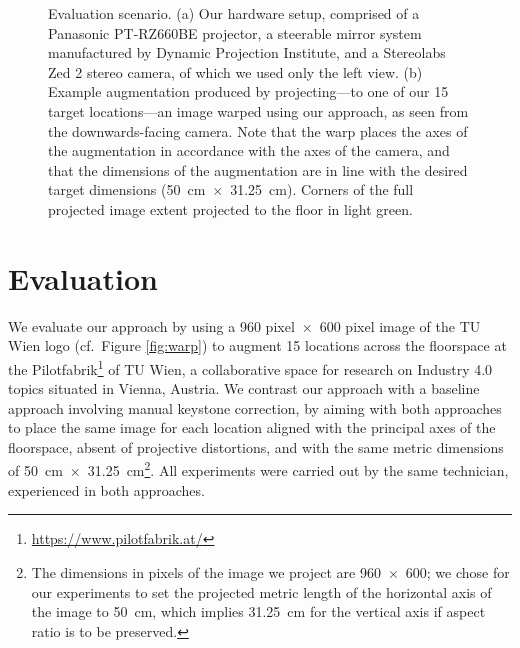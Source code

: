 \documentclass[review]{elsarticle}
\begin{document}
\begin{figure}
    \centering
    \quad
    \caption{Evaluation scenario. (a) Our hardware setup, comprised of a Panasonic PT-RZ660BE projector, a steerable mirror system manufactured by Dynamic Projection Institute, and a Stereolabs Zed 2 stereo camera, of which we used only the left view. (b) Example augmentation produced by projecting---to one of our 15 target locations---an image warped using our approach, as seen from the downwards-facing camera. Note that the warp places the axes of the augmentation in accordance with the axes of the camera, and that the dimensions of the augmentation are in line with the desired target dimensions (50~cm~$\times$~31.25~cm). Corners of the full projected image extent projected to the floor in light green.}
    \label{fig:eval}
\end{figure}

\section{Evaluation}
We evaluate our approach by using a 960 pixel~$\times$~600 pixel image of the TU Wien logo (cf.\ Figure \ref{fig:warp}) to augment 15 locations across the floorspace at the Pilotfabrik\footnote{\url{https://www.pilotfabrik.at/}} of TU Wien, a collaborative space for research on Industry 4.0 topics situated in Vienna, Austria. We contrast our approach with a baseline approach involving manual keystone correction, by aiming with both approaches to place the same image for each location aligned with the principal axes of the floorspace, absent of projective distortions, and with the same metric dimensions of 50~cm~$\times$~31.25~cm\footnote{The dimensions in pixels of the image we project are 960~$\times$~600; we chose for our experiments to set the projected metric length of the horizontal axis of the image to 50~cm, which implies 31.25~cm for the vertical axis if aspect ratio is to be preserved.}. All experiments were carried out by the same technician, experienced in both approaches.
\end{document}
